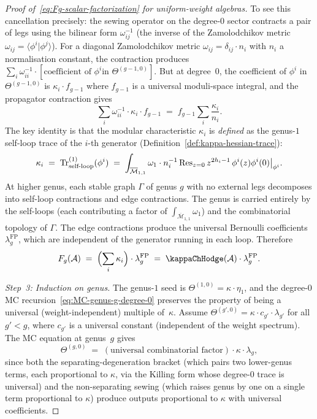 \begin{proof}[Proof of~\eqref{eq:Fg-scalar-factorization}
for uniform-weight algebras]
To see this cancellation precisely: the sewing operator on the
degree-$0$ sector contracts a pair of legs using the bilinear
form $\omega^{-1}_{ij}$ (the inverse of the Zamolodchikov
metric $\omega_{ij} = \langle \phi^i | \phi^j \rangle$).
For a diagonal Zamolodchikov metric
$\omega_{ij} = \delta_{ij} \cdot n_i$ with $n_i$ a
normalisation constant, the contraction produces
$\sum_i \omega^{-1}_{ii} \cdot [\text{coefficient of $\phi^i$
in } \Theta^{(g-1,0)}]$. But at degree~$0$, the
coefficient of $\phi^i$ in $\Theta^{(g-1,0)}$ is
$\kappa_i \cdot f_{g-1}$ where $f_{g-1}$ is a universal
moduli-space integral, and the propagator contraction gives
\[
\sum_i \omega^{-1}_{ii} \cdot \kappa_i \cdot f_{g-1}
\;=\; f_{g-1} \sum_i \frac{\kappa_i}{n_i}.
\]
The key identity is that the modular characteristic $\kappa_i$
is \emph{defined} as the genus-$1$ self-loop trace of the $i$-th
generator (Definition~\ref{def:kappa-hessian-trace}):
\begin{equation}\label{eq:kappa-i-propagator}
\kappa_i \;=\; \operatorname{Tr}_{\text{self-loop}}^{(1)}(\phi^i)
\;=\; \int_{\overline{\mathcal{M}}_{1,1}} \omega_1 \cdot
n_i^{-1} \operatorname{Res}_{z=0} z^{2h_i-1}\,
\phi^i(z)\phi^i(0)\big|_{\phi^i}.
\end{equation}
At higher genus, each stable graph $\Gamma$ of genus $g$ with no
external legs decomposes into self-loop contractions and edge
contractions. The genus is carried entirely by the self-loops
(each contributing a factor of
$\int_{\overline{\mathcal{M}}_{1,1}} \omega_1$) and the
combinatorial topology of $\Gamma$. The edge contractions
produce the universal Bernoulli coefficients
$\lambda_g^{\mathrm{FP}}$, which are independent of the
generator running in each loop. Therefore
\begin{equation}\label{eq:propagator-contraction-universal}
F_g(\mathcal{A}) \;=\; \Bigl(\sum_i \kappa_i\Bigr) \cdot
\lambda_g^{\mathrm{FP}} \;=\; \kappaChHodge(\mathcal{A}) \cdot
\lambda_g^{\mathrm{FP}}.
\end{equation}

\emph{Step~3: Induction on genus.} The
genus-$1$ seed is $\Theta^{(1,0)} = \kappa \cdot \eta_1$, and
the degree-$0$ MC recursion~\eqref{eq:MC-genus-g-degree-0}
preserves the property of being a universal (weight-independent)
multiple of~$\kappa$. Assume
$\Theta^{(g',0)} = \kappa \cdot c_{g'} \cdot \lambda_{g'}$
for all $g' < g$, where $c_{g'}$ is a universal constant
(independent of the weight spectrum). The MC equation at
genus~$g$ gives
\[
\Theta^{(g,0)} \;=\;
(\text{universal combinatorial factor}) \cdot \kappa \cdot
\lambda_g,
\]
since both the separating-degeneration bracket (which pairs
two lower-genus terms, each proportional to $\kappa$, via the
Killing form whose degree-$0$ trace is universal) and the
non-separating sewing (which raises genus by one on a single
term proportional to $\kappa$) produce outputs proportional
to $\kappa$ with universal coefficients.


\end{proof}
